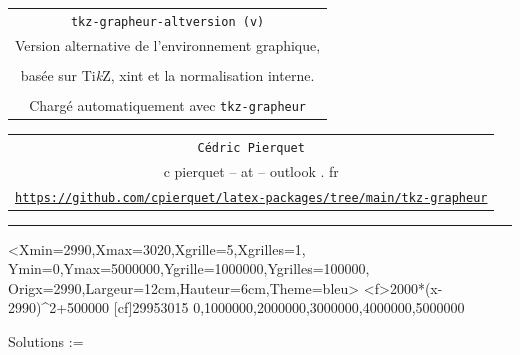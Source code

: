 \documentclass[11pt,a4paper]{ltxdoc}
\providecommand\tikzlogo{Ti\textit{k}Z}
\let\TikZ\tikzlogo
\begin{document}
\pagestyle{fancy}
\thispagestyle{empty}

\begin{center}
	\begin{minipage}{0.88\linewidth}
	\begin{tcolorbox}[colframe=orange!80!black,colback=orange!10]
		\begin{center}
			\begin{tabular}{c}
				{\huge\texttt{tkz-grapheur-altversion (v\tkzgrapheurversion)}}\vspace{10pt}\\
				{\LARGE Version alternative de l'environnement graphique,}\\
				\\
				{\LARGE basée sur \textsf{\TikZ}, \textsf{xint} et la normalisation interne.}\\
				\\
				{\small Chargé automatiquement avec \texttt{tkz-grapheur}}
		\end{tabular}
		\end{center}
	\end{tcolorbox}
	\end{minipage}
\end{center}

\begin{center}
	\begin{tabular}{c}
	\texttt{Cédric Pierquet}\\
	{\ttfamily c pierquet -- at -- outlook . fr}\\
	\texttt{\url{https://github.com/cpierquet/latex-packages/tree/main/tkz-grapheur}} \\
\end{tabular}
\end{center}

\hrule\vfill

\begin{tcolorbox}[colframe=lightgray,colback=lightgray!5,halign=center]
\begin{tkzGrph}%
	<Xmin=2990,Xmax=3020,Xgrille=5,Xgrilles=1,
	 Ymin=0,Ymax=5000000,Ygrille=1000000,Ygrilles=100000,
	 Origx=2990,Largeur=12cm,Hauteur=6cm,Theme=bleu>
	\tkzGrphDrawGridAxis[enlarge=2.5mm,font=\small,labels=false]{}{}
	{2000*(x-2990)^2+500000}
	[cf]{2995}{3015}
    {0,1000000,2000000,3000000,4000000,5000000}
\end{tkzGrph}

Solutions := \LISTRES
\end{tcolorbox}
\end{document}
